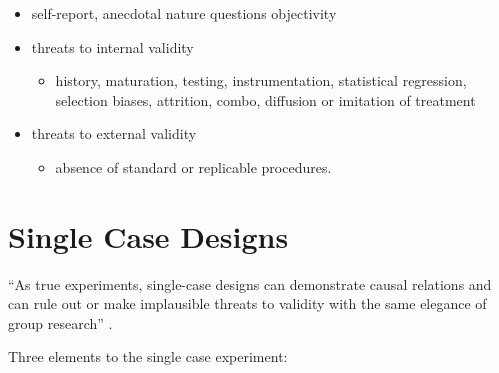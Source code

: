 \documentclass[
  english,
]{book}
\providecommand{\tightlist}{%
  \setlength{\itemsep}{0pt}\setlength{\parskip}{0pt}}
\begin{document}
\begin{itemize}
\tightlist
\item
  self-report, anecdotal nature questions objectivity
\item
  threats to internal validity

  \begin{itemize}
  \tightlist
  \item
    history, maturation, testing, instrumentation, statistical regression, selection biases, attrition, combo, diffusion or imitation of treatment
  \end{itemize}
\item
  threats to external validity

  \begin{itemize}
  \tightlist
  \item
    absence of standard or replicable procedures.
  \end{itemize}
\end{itemize}

\hypertarget{single-case-designs}{%
\section{Single Case Designs}\label{single-case-designs}}

``As true experiments, single-case designs can demonstrate causal relations and can rule out or make implausible threats to validity with the same elegance of group research'' \citep[p.~273]{kazdin_research_2017}.

Three elements to the single case experiment:
\end{document}
